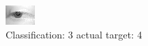 \begin{figure}[h!]
\begin{center}
\includegraphics[width=0.60\columnwidth]{figures/ID2715_class_3_target_4.png}
\end{center}
\caption{ Classification: 3 actual target: 4}
\label{fig:ID2715_class_3_target_4}
\end{figure}

